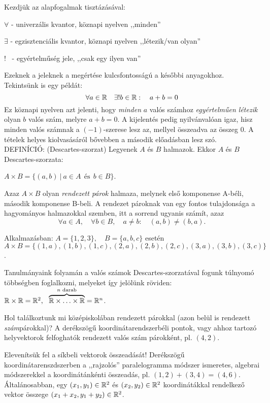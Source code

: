 \documentclass[a4paper,11.5pt]{article}
\begin{document}
	\noindent Kezdjük az alapfogalmak tisztázásával:
	\begin{compactitem}
		\item $\forall$ - univerzális kvantor, köznapi nyelven ,,minden''
		\item $\exists$ - egzisztenciális kvantor, köznapi nyelven ,,létezik/van olyan''
		\item $!$ \ - egyértelműség jele, ,,csak egy ilyen van''
	\end{compactitem}
	Ezeknek a jeleknek a megértése kulcsfontosságú a későbbi anyagokhoz. Tekintsünk is egy példát:
	\[\forall a \in \mathbb{R}\quad \exists!b \in \mathbb{R}: \quad a+b=0\]
	Ez köznapi nyelven azt jelenti, hogy \emph{minden} $a$ valós számhoz \emph{egyértelműen létezik} olyan $b$ valós szám, melyre $a+b=0$. A kijelentés pedig nyilvánvalóan igaz, hisz minden valós számnak a $(-1)$-szerese lesz az, mellyel összeadva az összeg 0. A tételek helyes kiolvasásáról bővebben a második előadásban lesz szó.\\
	DEFINÍCIÓ: (Descartes-szorzat) Legyenek $A$ és $B$ halmazok. Ekkor $A$ és $B$ Descartes-szorzata:
	\begin{center}
		$A \times B=\{(a,b)~|~a\in A~~\text{és}~~b\in B\}$.
	\end{center}
	\noindent Azaz $A\times B$ olyan \emph{rendezett párok} halmaza, melynek első komponense A-béli, második komponense B-beli. A rendezet pároknak van egy fontos tulajdonsága a hagyományos halmazokkal szemben, itt a sorrend ugyanis számít, azaz $$\forall a\in A,\quad \forall b\in B,\quad a\not=b: \quad (a,b)\not=(b,a).$$
	
	\noindent Alkalmazásban: $A=\{1, 2, 3\}, \quad B=\{a, b, c\}$ esetén\\
	$A\times B=\{(1, a), (1, b), (1, c), (2, a), (2, b), (2, c), (3, a), (3, b), (3, c)\}$.
	
	\bigskip
	Tanulmányaink folyamán a valós számok Descartes-szorzatával fogunk túlnyomó többségben foglalkozni, melyeket így jelölünk röviden: $\mathbb{R} \times\mathbb{R}=\mathbb{R}^2,~~\overbrace{\mathbb{R}\times\ldots\times\mathbb{R}}^{n \text{ darab}}=\mathbb{R}^{n}$.
	
	Hol találkoztunk mi középiskolában rendezett párokkal (azon belül is rendezett \emph{szám}pá\-rok\-kal)? A derékszögű koordinátarendszerbéli pontok, vagy ahhoz tartozó helyvektorok felfoghatók rendezett valós szám párokként, pl. $(4, 2)$. 
	
	Elevenítsük fel a síkbeli vektorok összeadását! Derékszögű koordinátarenszdszerben a ,,rajzolós'' paralelogramma módszer ismeretes, algebrai módszerekkel a koordinátánkénti  összeadás, pl. $(1, 2) + (3, 4) =(4, 6)$. Általánosabban, egy $(x_1, y_1) \in \mathbb{R}^2$ és $(x_2, y_2) \in \mathbb{R}^2$ koordinátákkal rendelkező vektor összege $(x_1+x_2, y_1+y_2) \in \mathbb{R}^2$.
	
\end{document}
